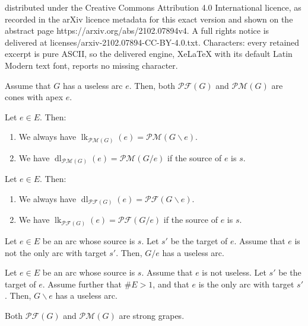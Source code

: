 \documentclass[10pt,a4paper]{amsart}
\DeclareMathOperator{\dl}{dl}
\DeclareMathOperator{\lk}{lk}
\newcommand{\Pf}[1]{\mathcal{PF}\left(#1\right)}
\newcommand{\Pm}[1]{\mathcal{PM}\left(#1\right)}
\begin{document}
distributed under the Creative Commons Attribution 4.0 International licence, as recorded in the arXiv licence metadata for this exact version and shown on the abstract page https://arxiv.org/abs/2102.07894v4. A full rights notice is delivered at licenses/arxiv-2102.07894-CC-BY-4.0.txt. Characters: every retained excerpt is pure ASCII, so the delivered engine, XeLaTeX with its default Latin Modern text font, reports no missing character.
\begin{lemma}\label{lem:dumbarc}
    Assume that $G$ has a useless arc $e$.
    Then, both $\Pf{G}$ and $\Pm{G}$ are cones with apex $e$.
\end{lemma}

\begin{lemma}\label{lem:delcon}
    Let $e \in E$. Then:
    \begin{enumerate}
        \item[(a)] We always have $\lk_{\Pm{G}}(e) = \Pm{G \backslash e}$.
        \item[(b)] We have $\dl_{\Pm{G}}(e) = \Pm{G / e}$ if the source of $e$ is $s$.
    \end{enumerate}
\end{lemma}

\begin{lemma}\label{lem:delcon_pf}
	Let $e \in E$. Then:
	\begin{enumerate}
		\item[(a)] We always have $\dl_{\Pf{G}}(e) = \Pf{G \backslash e}$.
		\item[(b)] We have $\lk_{\Pf{G}}(e) = \Pf{G / e}$ if the source of $e$ is $s$.
	\end{enumerate}
\end{lemma}

\begin{lemma}\label{lem:induction_step_1}
	Let $e \in E$ be an arc whose source is $s$.
    Let $s'$ be the target of $e$.
    Assume that $e$ is not the only arc with target $s'$.
    Then, $G / e$ has a useless arc.
\end{lemma}

\begin{lemma}\label{lem:induction_step_2b}
	Let $e \in E$ be an arc whose source is $s$.
    Assume that $e$ is not useless.
    Let $s'$ be the target of $e$.
	Assume further that $\# E > 1$, and that $e$ is the only arc with target $s'$.
    Then, $G \backslash e$ has a useless arc.
\end{lemma}

\begin{proposition}
\label{prop.strong-grapes.PfPm}
Both $\Pf{G}$ and $\Pm{G}$ are strong grapes.
\end{proposition}
\end{document}
